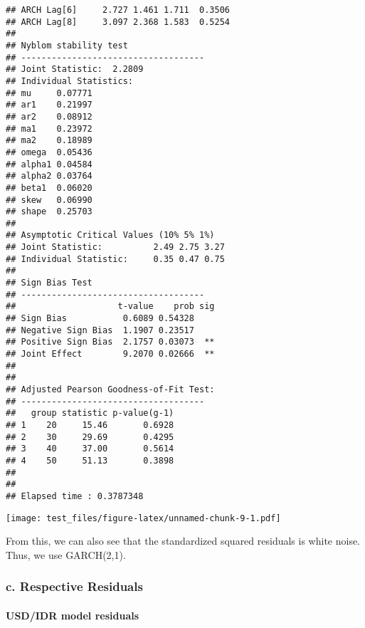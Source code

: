 \documentclass[]{article}
\newenvironment{Shaded}{\begin{snugshade}}{\end{snugshade}}
\newcommand{\KeywordTok}[1]{\textcolor[rgb]{0.13,0.29,0.53}{\textbf{#1}}}
\newcommand{\DataTypeTok}[1]{\textcolor[rgb]{0.13,0.29,0.53}{#1}}
\newcommand{\StringTok}[1]{\textcolor[rgb]{0.31,0.60,0.02}{#1}}
\newcommand{\CommentTok}[1]{\textcolor[rgb]{0.56,0.35,0.01}{\textit{#1}}}
\newcommand{\OperatorTok}[1]{\textcolor[rgb]{0.81,0.36,0.00}{\textbf{#1}}}
\newcommand{\NormalTok}[1]{#1}
\let\oldparagraph\paragraph
\renewcommand{\paragraph}[1]{\oldparagraph{#1}\mbox{}}
\begin{document}
\begin{verbatim}
## ARCH Lag[6]     2.727 1.461 1.711  0.3506
## ARCH Lag[8]     3.097 2.368 1.583  0.5254
## 
## Nyblom stability test
## ------------------------------------
## Joint Statistic:  2.2809
## Individual Statistics:              
## mu     0.07771
## ar1    0.21997
## ar2    0.08912
## ma1    0.23972
## ma2    0.18989
## omega  0.05436
## alpha1 0.04584
## alpha2 0.03764
## beta1  0.06020
## skew   0.06990
## shape  0.25703
## 
## Asymptotic Critical Values (10% 5% 1%)
## Joint Statistic:          2.49 2.75 3.27
## Individual Statistic:     0.35 0.47 0.75
## 
## Sign Bias Test
## ------------------------------------
##                    t-value    prob sig
## Sign Bias           0.6089 0.54328    
## Negative Sign Bias  1.1907 0.23517    
## Positive Sign Bias  2.1757 0.03073  **
## Joint Effect        9.2070 0.02666  **
## 
## 
## Adjusted Pearson Goodness-of-Fit Test:
## ------------------------------------
##   group statistic p-value(g-1)
## 1    20     15.46       0.6928
## 2    30     29.69       0.4295
## 3    40     37.00       0.5614
## 4    50     51.13       0.3898
## 
## 
## Elapsed time : 0.3787348
\end{verbatim}

\begin{Shaded}
\end{Shaded}

\texttt{[image: test\_files/figure-latex/unnamed-chunk-9-1.pdf]}

From this, we can also see that the standardized squared residuals is
white noise. Thus, we use GARCH(2,1).

\subsubsection{c. Respective Residuals}\label{c.-respective-residuals}

\paragraph{USD/IDR model residuals}\label{usdidr-model-residuals}
\end{document}
